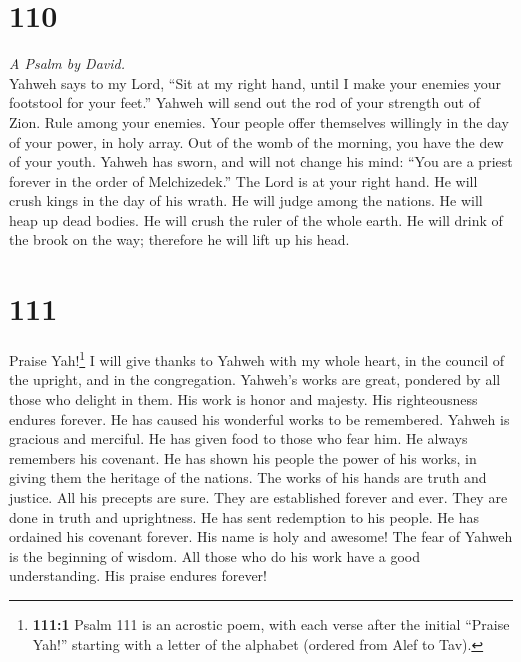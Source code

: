 \hypertarget{section-109}{%
\section{110}\label{section-109}}

\emph{A Psalm by David.}\\
 Yahweh says to my Lord, ``Sit at my right hand, until I
make your enemies your footstool for your feet.''  Yahweh
will send out the rod of your strength out of Zion. Rule among your
enemies.  Your people offer themselves willingly in the
day of your power, in holy array. Out of the womb of the morning, you
have the dew of your youth.  Yahweh has sworn, and will
not change his mind: ``You are a priest forever in the order of
Melchizedek.''  The Lord is at your right hand. He will
crush kings in the day of his wrath.  He will judge among
the nations. He will heap up dead bodies. He will crush the ruler of the
whole earth.  He will drink of the brook on the way;
therefore he will lift up his head.

\hypertarget{section-110}{%
\section{111}\label{section-110}}

 Praise Yah!\footnote{\textbf{111:1} Psalm 111 is an
  acrostic poem, with each verse after the initial ``Praise Yah!''
  starting with a letter of the alphabet (ordered from Alef to Tav).} I
will give thanks to Yahweh with my whole heart, in the council of the
upright, and in the congregation.  Yahweh's works are
great, pondered by all those who delight in them.  His
work is honor and majesty. His righteousness endures forever.
 He has caused his wonderful works to be remembered.
Yahweh is gracious and merciful.  He has given food to
those who fear him. He always remembers his covenant.  He
has shown his people the power of his works, in giving them the heritage
of the nations.  The works of his hands are truth and
justice. All his precepts are sure.  They are established
forever and ever. They are done in truth and uprightness. 
He has sent redemption to his people. He has ordained his covenant
forever. His name is holy and awesome!  The fear of
Yahweh is the beginning of wisdom. All those who do his work have a good
understanding. His praise endures forever!


